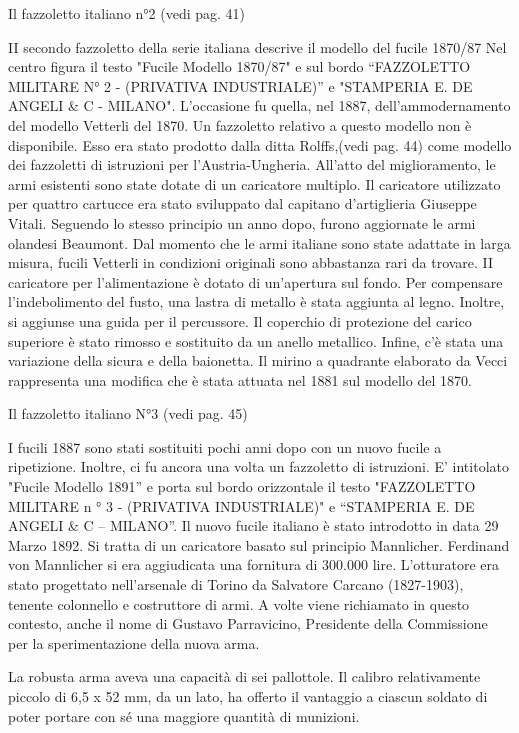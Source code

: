 Il fazzoletto italiano n°2 (vedi pag. 41)
  
 II secondo fazzoletto della serie italiana descrive il modello del fucile 1870/87 Nel centro figura il testo "Fucile Modello 1870/87" e sul bordo “FAZZOLETTO MILITARE N° 2 - (PRIVATIVA INDUSTRIALE)” e "STAMPERIA E. DE ANGELI \& C - MILANO". L'occasione fu quella, nel 1887, dell'ammodernamento del modello Vetterli del 1870. Un fazzoletto relativo a questo modello non è disponibile. Esso era stato prodotto dalla ditta Rolffs,(vedi pag. 44) come modello dei fazzoletti di istruzioni per l'Austria-Ungheria. 
   All'atto del miglioramento, le armi esistenti sono state dotate di un caricatore multiplo. Il caricatore utilizzato per quattro cartucce era stato sviluppato dal capitano d'artiglieria Giuseppe Vitali. Seguendo lo stesso principio un anno dopo, furono aggiornate le armi olandesi Beaumont. Dal momento che le armi italiane sono state adattate in larga misura, fucili Vetterli in condizioni originali sono abbastanza rari da trovare. II caricatore per l'alimentazione è dotato di un'apertura sul fondo. Per compensare l'indebolimento del fusto, una lastra di metallo è stata aggiunta al legno. Inoltre, si aggiunse una guida per il percussore. Il coperchio di protezione del carico superiore è stato rimosso e sostituito da un anello metallico. 
   Infine, c'è stata una variazione della sicura e della baionetta. Il mirino a quadrante elaborato da Vecci rappresenta una modifica che è stata attuata nel 1881 sul modello del 1870.

Il fazzoletto italiano N°3 (vedi pag. 45)
  
 I fucili 1887 sono stati sostituiti pochi anni dopo con un nuovo fucile a ripetizione. Inoltre, ci fu ancora una volta un fazzoletto di istruzioni. E' intitolato "Fucile Modello 1891” e porta sul bordo orizzontale il testo "FAZZOLETTO MILITARE n ° 3 - (PRIVATIVA INDUSTRIALE)" e “STAMPERIA E. DE ANGELI \& C – MILANO”. 
   Il nuovo fucile italiano è stato introdotto in data 29 Marzo 1892. Si tratta di un caricatore basato sul principio Mannlicher. Ferdinand von Mannlicher si era aggiudicata una fornitura di 300.000 lire. L'otturatore era stato progettato nell'arsenale di Torino da Salvatore Carcano (1827-1903), tenente colonnello e costruttore di armi. A volte viene richiamato in questo contesto, anche il nome di Gustavo Parravicino, Presidente della Commissione per la sperimentazione della nuova arma.
   
\newpage

La robusta arma aveva una capacità di sei pallottole. Il calibro relativamente piccolo di 6,5 x 52 mm, da un lato, ha offerto il vantaggio a ciascun soldato di poter portare con sé una maggiore quantità di munizioni.

